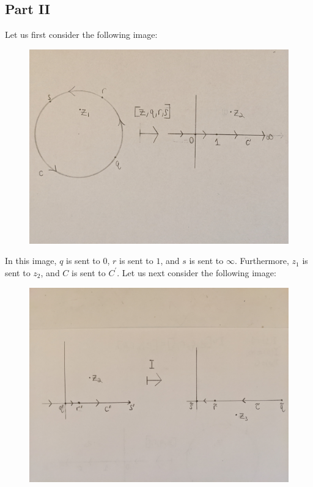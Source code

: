 \documentclass[12pt]{article}
\begin{document}
\subsection*{Part II}
Let us first consider the following image:
\begin{figure}[H]
\centering
\includegraphics[width=\textwidth]{Problem16Image1}
\end{figure} 
\noindent In this image, $q$ is sent to $0$, $r$ is sent to $1$, and $s$ is sent to $\infty$. Furthermore, $z_1$ is sent to $z_2$, and $C$ is sent to $C^\prime$. Let us next consider the following image:
\begin{figure}[H]
\centering
\includegraphics[width=\textwidth]{Problem16Image2}
\end{figure} 
\end{document}
